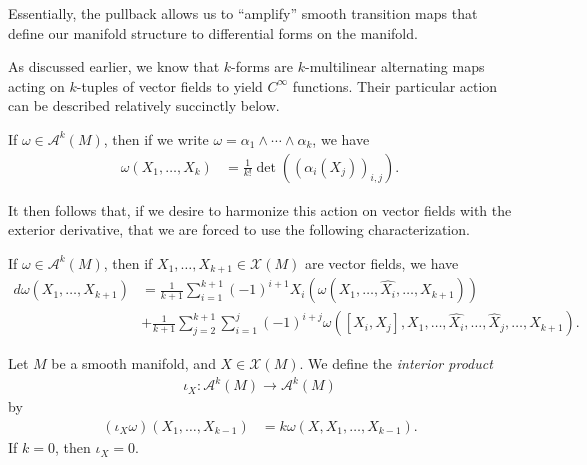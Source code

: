 \documentclass[10pt]{mypackage}
\begin{document}
Essentially, the pullback allows us to ``amplify'' smooth transition maps that define our manifold structure to differential forms on the manifold.\newline

As discussed earlier, we know that $k$-forms are $k$-multilinear alternating maps acting on $k$-tuples of vector fields to yield $C^{\infty}$ functions. Their particular action can be described relatively succinctly below.
\begin{definition}
  If $\omega\in \mathcal{A}^{k}\left( M \right)$, then if we write $\omega = \alpha_1\wedge\cdots\wedge \alpha_k$, we have
  \begin{align*}
    \omega\left( X_1,\dots,X_k \right) &= \frac{1}{k!}\det \left( \left( \alpha_{i}\left( X_j \right) \right)_{i,j} \right).
  \end{align*}
\end{definition}
It then follows that, if we desire to harmonize this action on vector fields with the exterior derivative, that we are forced to use the following characterization.
\begin{proposition}
  If $\omega\in \mathcal{A}^{k}\left( M \right)$, then if $X_1,\dots,X_{k+1}\in \mathcal{X}\left( M \right)$ are vector fields, we have
  \begin{align*}
    d\omega\left( X_1,\dots,X_{k+1} \right) &= \frac{1}{k+1} \sum_{i=1}^{k+1} \left( -1 \right)^{i+1}X_i\left( \omega\left( X_1,\dots,\widehat{X_i},\dots,X_{k+1} \right) \right)\\
                                            &+ \frac{1}{k+1}\sum_{j=2}^{k+1}\sum_{i=1}^{j} \left( -1 \right)^{i+j} \omega\left( \left[ X_i,X_j \right],X_1,\dots,\widehat{X_i},\dots,\widehat{X}_j,\dots,X_{k+1} \right).
  \end{align*}
\end{proposition}
\begin{definition}
  Let $M$ be a smooth manifold, and $X\in \mathcal{X}\left( M \right)$. We define the \textit{interior product}
  \begin{align*}
    \iota_X\colon \mathcal{A}^{k}\left( M \right)\rightarrow \mathcal{A}^{k}\left( M \right)
  \end{align*}
  by
  \begin{align*}
    \left( \iota_X\omega \right)\left( X_1,\dots,X_{k-1} \right) &= k\omega\left( X,X_1,\dots,X_{k-1} \right).
  \end{align*}
  If $k = 0$, then $\iota_X = 0$.
\end{definition}
\end{document}
